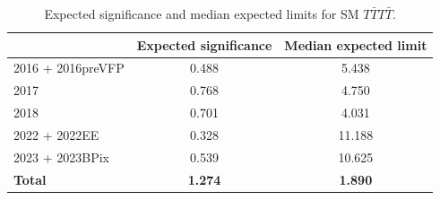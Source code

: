 \documentclass[twoside]{article}
\begin{document}
\begin{table}[h!]
    \centering
    \begin{tabular}{lcc}
        \toprule
        & \textbf{Expected significance} & \textbf{Median expected limit} \\
        \midrule
        2016 + 2016preVFP & 0.488 & 5.438 \\
        2017              & 0.768 & 4.750 \\
        2018              & 0.701 & 4.031 \\
        2022 + 2022EE     & 0.328 & 11.188 \\
        2023 + 2023BPix   & 0.539 & 10.625 \\
        \midrule
        \textbf{Total}    & \textbf{1.274} & \textbf{1.890} \\
        \bottomrule
    \end{tabular}
    \caption{Expected significance and median expected limits for SM $T\bar{T}T\bar{T}$.}
    \label{tab:combine_res_blineded_sm}
\end{table}
\end{document}
